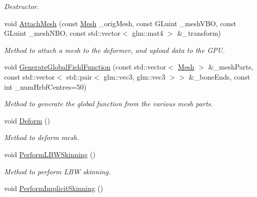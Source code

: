 \begin{DoxyCompactItemize}
\begin{DoxyCompactList}\small\item\em Destructor. \end{DoxyCompactList}\item 
void \hyperlink{classImplicitSkinDeformer_a9254d0b0fe0d7879bbe255ae450a5f6c}{Attach\+Mesh} (const \hyperlink{classMesh}{Mesh} \+\_\+orig\+Mesh, const G\+Luint \+\_\+mesh\+V\+BO, const G\+Luint \+\_\+mesh\+N\+BO, const std\+::vector$<$ glm\+::mat4 $>$ \&\+\_\+transform)
\begin{DoxyCompactList}\small\item\em Method to attach a mesh to the deformer, and upload data to the G\+PU. \end{DoxyCompactList}\item 
void \hyperlink{classImplicitSkinDeformer_aac11f0d7043bf72417506e3f2d1e6115}{Generate\+Global\+Field\+Function} (const std\+::vector$<$ \hyperlink{classMesh}{Mesh} $>$ \&\+\_\+mesh\+Parts, const std\+::vector$<$ std\+::pair$<$ glm\+::vec3, glm\+::vec3 $>$$>$ \&\+\_\+bone\+Ends, const int \+\_\+num\+Hrbf\+Centres=50)
\begin{DoxyCompactList}\small\item\em Method to generate the global function from the various mesh parts. \end{DoxyCompactList}\item 
void \hyperlink{classImplicitSkinDeformer_ae52a185239c8423afa3203ab6a3b73ee}{Deform} ()\hypertarget{classImplicitSkinDeformer_ae52a185239c8423afa3203ab6a3b73ee}{}\label{classImplicitSkinDeformer_ae52a185239c8423afa3203ab6a3b73ee}

\begin{DoxyCompactList}\small\item\em Method to deform mesh. \end{DoxyCompactList}\item 
void \hyperlink{classImplicitSkinDeformer_accd43f7784e9c7499b3a735416d1d3ed}{Perform\+L\+B\+W\+Skinning} ()
\begin{DoxyCompactList}\small\item\em Method to perform L\+BW skinning. \end{DoxyCompactList}\item 
void \hyperlink{classImplicitSkinDeformer_a92e13917cbab98dac1459c22f4b9830d}{Perform\+Implicit\+Skinning} ()\hypertarget{classImplicitSkinDeformer_a92e13917cbab98dac1459c22f4b9830d}{}\label{classImplicitSkinDeformer_a92e13917cbab98dac1459c22f4b9830d}


\end{DoxyCompactItemize}
